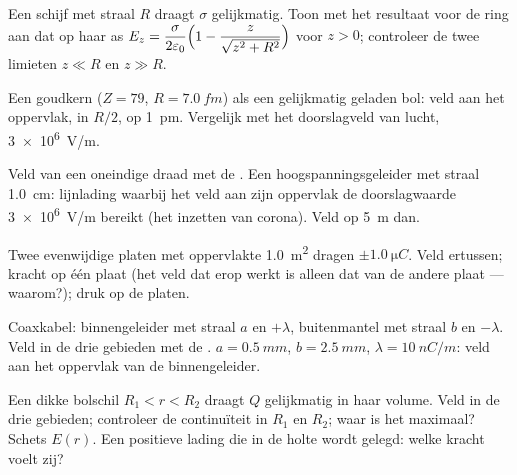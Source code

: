 \begin{exercise}[$\star\star$]\label{exo:b1:electrostatics-gauss:5}
Een schijf met straal $R$ draagt $\sigma$ gelijkmatig. Toon met het resultaat voor de ring
aan dat op haar as $E_z = \dfrac{\sigma}{2\varepsilon_0}\Bigl(1 - \dfrac{z}{\sqrt{z^2 +
R^2}}\Bigr)$ voor $z > 0$; controleer de twee limieten $z \ll R$ en $z \gg R$.
\end{exercise}

\begin{exercise}[$\star\star$]\label{exo:b1:electrostatics-gauss:6}
Een goudkern ($Z = 79$, $R = \qty{7.0}{fm}$) als een gelijkmatig geladen
bol: veld aan het oppervlak, in $R/2$, op \qty{1}{pm}. Vergelijk met het
doorslagveld van lucht, \qty{3e6}{V/m}.
\end{exercise}

\begin{exercise}[$\star\star$]\label{exo:b1:electrostatics-gauss:7}
Veld van een oneindige draad met de . Een hoogspanningsgeleider met
straal \qty{1.0}{cm}: lijnlading waarbij het veld aan zijn oppervlak
de doorslagwaarde \qty{3e6}{V/m} bereikt (het inzetten van corona). Veld op
\qty{5}{m} dan.
\end{exercise}

\begin{exercise}[$\star\star$]\label{exo:b1:electrostatics-gauss:8}
Twee evenwijdige platen met oppervlakte \qty{1.0}{m^2} dragen $\pm\qty{1.0}{\micro C}$.
Veld ertussen; kracht op één plaat (het veld dat erop werkt is alleen dat
van de andere plaat --- waarom?); druk op de platen.
\end{exercise}

\begin{exercise}[$\star\star$]\label{exo:b1:electrostatics-gauss:9}
Coaxkabel: binnengeleider met straal $a$ en $+\lambda$, buitenmantel
met straal $b$ en $-\lambda$. Veld in de drie gebieden met
de . $a = \qty{0.5}{mm}$, $b = \qty{2.5}{mm}$, $\lambda = \qty{10}{nC/m}$:
veld aan het oppervlak van de binnengeleider.
\end{exercise}

\begin{exercise}[$\star\star\star$]\label{exo:b1:electrostatics-gauss:10}
Een dikke bolschil $R_1 < r < R_2$ draagt $Q$ gelijkmatig in haar
volume. Veld in de drie gebieden; controleer de continuïteit in $R_1$ en
$R_2$; waar is het maximaal? Schets $E(r)$. Een positieve lading die
in de holte wordt gelegd: welke kracht voelt zij?
\end{exercise}

